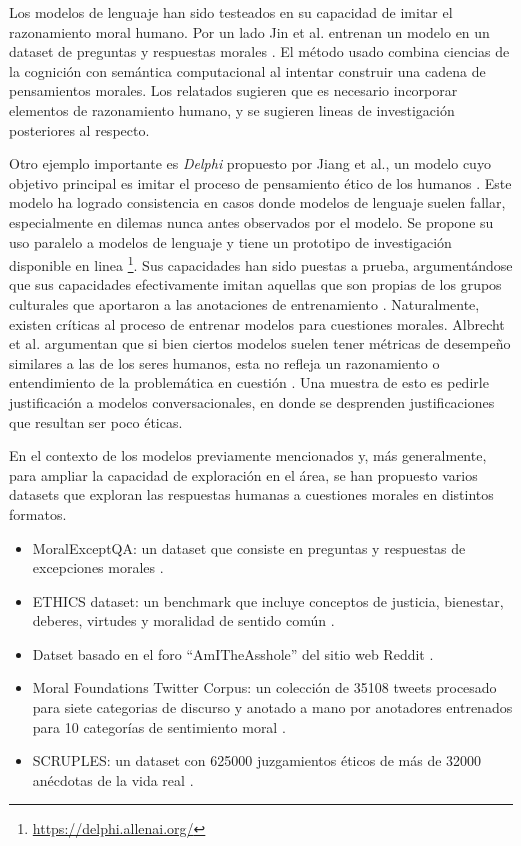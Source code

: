 \documentclass[
	spanish, %
	letterpaper, oneside
]{article}
\begin{document}

Los modelos de lenguaje han sido testeados en su capacidad de imitar el razonamiento moral humano. Por un lado Jin et al. entrenan un modelo en un dataset de preguntas y respuestas morales \cite{Jin}. El método usado combina ciencias de la cognición con semántica computacional al intentar construir una cadena de pensamientos morales. Los relatados sugieren que es necesario incorporar elementos de razonamiento humano, y se sugieren lineas de investigación posteriores al respecto.

\newp Otro ejemplo importante es \textit{Delphi} propuesto por Jiang et al., un modelo cuyo objetivo principal es imitar el proceso de pensamiento ético de los humanos \cite{Jiang}. Este modelo ha logrado consistencia en casos donde modelos de lenguaje suelen fallar, especialmente en dilemas nunca antes observados por el modelo. Se propone su uso paralelo a modelos de lenguaje y tiene un prototipo de investigación disponible en linea \footnote{\url{https://delphi.allenai.org/}}. Sus capacidades han sido puestas a prueba, argumentándose que sus capacidades efectivamente imitan aquellas que son propias de los grupos culturales que aportaron a las anotaciones de entrenamiento \cite{Fraser}. Naturalmente, existen críticas al proceso de entrenar modelos para cuestiones morales. Albrecht et al. argumentan que si bien ciertos modelos suelen tener métricas de desempeño similares a las de los seres humanos, esta no refleja un razonamiento o entendimiento de la problemática en cuestión \cite{Albrecht}. Una muestra de esto es pedirle justificación a modelos conversacionales, en donde se desprenden justificaciones que resultan ser poco éticas.



En el contexto de los modelos previamente mencionados y, más generalmente, para ampliar la capacidad de exploración en el área, se han propuesto varios datasets que exploran las respuestas humanas a cuestiones morales en distintos formatos.

\begin{itemize}
    \item MoralExceptQA: un dataset que consiste en preguntas y respuestas de excepciones morales \cite{Jin}.
    \item ETHICS dataset: un benchmark que incluye conceptos de justicia, bienestar, deberes, virtudes y moralidad de sentido común \cite{Hen}.
    \item Datset basado en el foro ``AmITheAsshole'' del sitio web Reddit \cite{Efs}.
    \item Moral Foundations Twitter Corpus: un colección de 35108 tweets procesado para siete categorias de discurso y anotado a mano por anotadores entrenados para 10 categorías de sentimiento moral \cite{Hoover}.
    \item SCRUPLES: un dataset con 625000 juzgamientos éticos de más de 32000 anécdotas de la vida real \cite{Lourie}.
\end{itemize}
\end{document}
